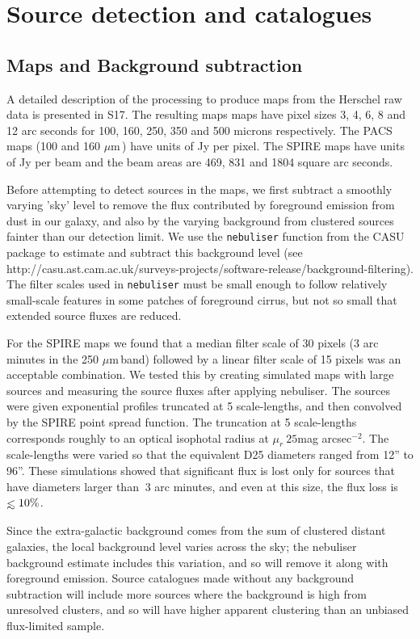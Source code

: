 \documentclass[useAMS,usenatbib]{mn2e}
\def\lesssim{\mathrel{\hbox{\rlap{\hbox{\lower4pt\hbox{$\sim$}}}\hbox{$<$}}}}
\def\mic{ $\mu $m\,}
\begin{document}
 

\section{ Source detection and catalogues } 

\subsection{Maps and Background subtraction} 

A detailed description of the processing to produce maps from the
Herschel raw data is presented in S17. The resulting maps maps have
pixel sizes 3, 4, 6, 8 and 12 arc seconds for 100, 160, 250, 350 and
500 microns respectively. The PACS maps (100 and 160\mic) have units
of Jy per pixel. The SPIRE maps have units of Jy per beam and the beam
areas are 469, 831 and 1804 square arc seconds.


Before attempting to detect sources in the maps, we first subtract a
smoothly varying 'sky' level to remove the flux contributed by
foreground emission from dust in our galaxy, and also by the varying
background from clustered sources fainter than our detection limit. We
use the {\tt nebuliser} function from the CASU package to estimate and
subtract this background level (see
http://casu.ast.cam.ac.uk/surveys-projects/software-release/background-filtering). The
filter scales used in {\tt nebuliser} must be small enough to follow
relatively small-scale features in some patches of foreground cirrus,
but not so small that extended source fluxes are reduced.


For the SPIRE maps we found that a median filter scale of 30 pixels (3
arc minutes in the 250 \mic band) followed by a linear filter scale of
15 pixels was an acceptable combination. We tested this by creating
simulated maps with large sources and measuring the source fluxes
after applying nebuliser. The sources were given exponential profiles
truncated at 5 scale-lengths, and then convolved by the SPIRE point
spread function.  The truncation at 5 scale-lengths corresponds
roughly to an optical isophotal radius at $\mu_r ~ 25 $mag
arcsec$^{-2}$. The scale-lengths were varied so that the equivalent D25
diameters ranged from 12'' to 96''.
These simulations showed that significant flux is lost only for
sources that have diameters larger than $~3$ arc minutes, and even at
this size, the flux loss is $\lesssim 10\%$.

Since the extra-galactic background comes from the sum of clustered
distant galaxies, the local background level varies across the sky;
the nebuliser background estimate includes this variation, and so will
remove it along with foreground emission. Source catalogues made
without any background subtraction will include more sources where the
background is high from unresolved clusters, and so will have higher
apparent clustering than an unbiased flux-limited sample. 
\end{document}

